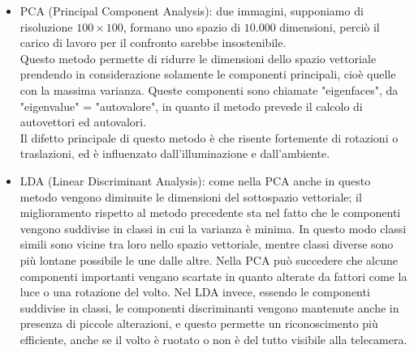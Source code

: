 \begin{itemize}
\item PCA (Principal Component Analysis): due immagini, supponiamo di risoluzione $100\times100$, formano uno spazio di $10.000$ dimensioni, perciò il carico di lavoro per il confronto sarebbe insostenibile.\\
Questo metodo permette di ridurre le dimensioni dello spazio vettoriale prendendo in considerazione solamente le componenti principali, cioè quelle con la massima varianza.
Queste componenti sono chiamate "eigenfaces", da "eigenvalue" = "autovalore", in quanto il metodo prevede il calcolo di autovettori ed autovalori.\\
Il difetto principale di questo metodo è che risente fortemente di rotazioni o traslazioni, ed è influenzato dall'illuminazione e dall'ambiente.

\item LDA (Linear Discriminant Analysis): come nella PCA anche in questo metodo vengono diminuite le dimensioni del sottospazio vettoriale; il miglioramento rispetto al metodo precedente sta nel fatto che le componenti vengono suddivise in classi in cui la varianza è minima. In questo modo classi simili sono vicine tra loro nello spazio vettoriale, mentre classi diverse sono più lontane possibile le une dalle altre. Nella PCA può succedere che alcune componenti importanti vengano scartate in quanto alterate da fattori come la luce o una rotazione del volto. Nel LDA invece, essendo le componenti suddivise in classi, le componenti discriminanti vengono mantenute anche in presenza di piccole alterazioni, e questo permette un riconoscimento più efficiente, anche se il volto è ruotato o non è del tutto visibile alla telecamera.


\end{itemize}
